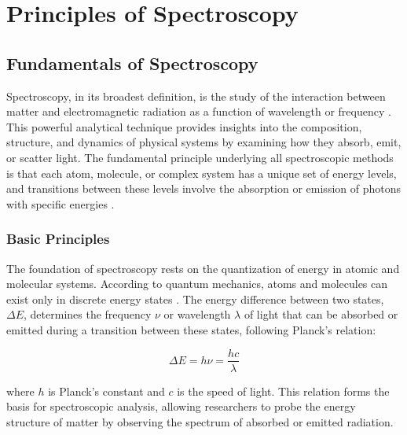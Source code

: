 \chapter{Principles of Spectroscopy} %

\label{chap:spectroscopy} %


\section{Fundamentals of Spectroscopy}
\label{sec:spectroscopy_fundamentals}

\noindent Spectroscopy, in its broadest definition, is the study of the interaction between matter and electromagnetic radiation as a function of wavelength or frequency \cite{Mukamel1995}. This powerful analytical technique provides insights into the composition, structure, and dynamics of physical systems by examining how they absorb, emit, or scatter light. The fundamental principle underlying all spectroscopic methods is that each atom, molecule, or complex system has a unique set of energy levels, and transitions between these levels involve the absorption or emission of photons with specific energies \cite{Boyd2008}.

\subsection{Basic Principles}
\label{subsec:basic_principles}

\noindent The foundation of spectroscopy rests on the quantization of energy in atomic and molecular systems. According to quantum mechanics, atoms and molecules can exist only in discrete energy states \cite{albashQuantumAdiabaticMarkovian2012}. The energy difference between two states, $\Delta E$, determines the frequency $\nu$ or wavelength $\lambda$ of light that can be absorbed or emitted during a transition between these states, following Planck's relation:

\begin{equation}
    \Delta E = h\nu = \frac{hc}{\lambda}
    \label{eq:planck_relation}
\end{equation}

\noindent where $h$ is Planck's constant and $c$ is the speed of light. This relation forms the basis for spectroscopic analysis, allowing researchers to probe the energy structure of matter by observing the spectrum of absorbed or emitted radiation.

